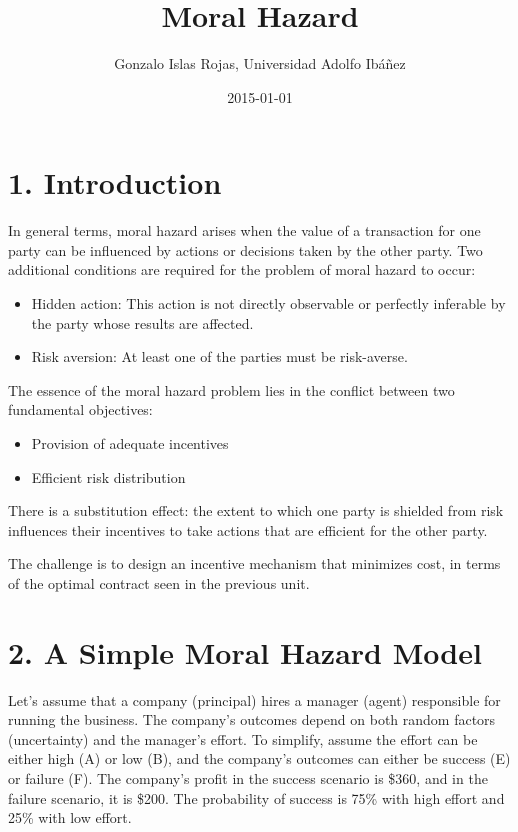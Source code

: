 \documentclass[
  letterpaper,
  DIV=11,
  numbers=noendperiod]{scrartcl}
\title{Moral Hazard}
\author{Gonzalo Islas Rojas, Universidad Adolfo Ibáñez}
\date{2015-01-01}
\providecommand{\tightlist}{%
  \setlength{\itemsep}{0pt}\setlength{\parskip}{0pt}}\usepackage{longtable,booktabs,array}
\begin{document}
\maketitle

\section{1. Introduction}\label{introduction}

In general terms, moral hazard arises when the value of a transaction
for one party can be influenced by actions or decisions taken by the
other party. Two additional conditions are required for the problem of
moral hazard to occur:

\begin{itemize}
\tightlist
\item
  Hidden action: This action is not directly observable or perfectly
  inferable by the party whose results are affected.
\item
  Risk aversion: At least one of the parties must be risk-averse.
\end{itemize}

The essence of the moral hazard problem lies in the conflict between two
fundamental objectives:

\begin{itemize}
\tightlist
\item
  Provision of adequate incentives
\item
  Efficient risk distribution
\end{itemize}

There is a substitution effect: the extent to which one party is
shielded from risk influences their incentives to take actions that are
efficient for the other party.

The challenge is to design an incentive mechanism that minimizes cost,
in terms of the optimal contract seen in the previous unit.

\section{2. A Simple Moral Hazard
Model}\label{a-simple-moral-hazard-model}

Let's assume that a company (principal) hires a manager (agent)
responsible for running the business. The company's outcomes depend on
both random factors (uncertainty) and the manager's effort. To simplify,
assume the effort can be either high (A) or low (B), and the company's
outcomes can either be success (E) or failure (F). The company's profit
in the success scenario is \$360, and in the failure scenario, it is
\$200. The probability of success is 75\% with high effort and 25\% with
low effort.
\end{document}
